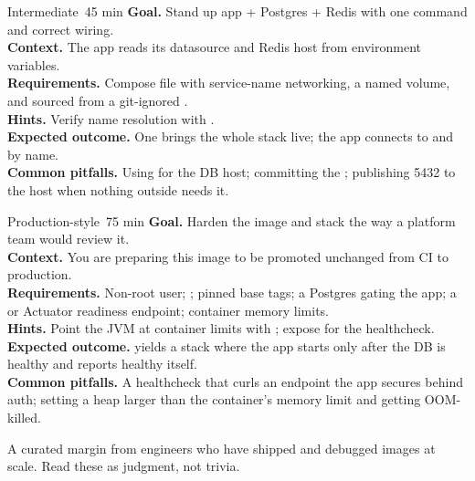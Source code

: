 \begin{minilab}{Intermediate}{~45 min}
\textbf{Goal.} Stand up app + Postgres + Redis with one command and correct wiring.\\
\textbf{Context.} The app reads its datasource and Redis host from environment variables.\\
\textbf{Requirements.} Compose file with service-name networking, a  named volume, and  sourced from a git-ignored .\\
\textbf{Hints.} Verify name resolution with .\\
\textbf{Expected outcome.} One  brings the whole stack live; the app connects to  and  by name.\\
\textbf{Common pitfalls.} Using  for the DB host; committing the ; publishing 5432 to the host when nothing outside needs it.
\end{minilab}

\begin{minilab}{Production-style}{~75 min}
\textbf{Goal.} Harden the image and stack the way a platform team would review it.\\
\textbf{Context.} You are preparing this image to be promoted unchanged from CI to production.\\
\textbf{Requirements.} Non-root user; ; pinned base tags; a Postgres  gating the app; a  or Actuator readiness endpoint; container memory limits.\\
\textbf{Hints.} Point the JVM at container limits with ; expose  for the healthcheck.\\
\textbf{Expected outcome.}  yields a stack where the app starts only after the DB is healthy and reports healthy itself.\\
\textbf{Common pitfalls.} A healthcheck that curls an endpoint the app secures behind auth; setting a heap larger than the container's memory limit and getting OOM-killed.
\end{minilab}


A curated margin from engineers who have shipped and debugged images at scale. Read these as judgment, not trivia.

